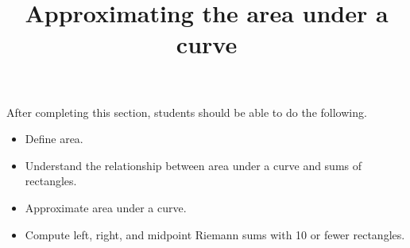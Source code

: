 \documentclass{ximera}
\title{Approximating the area under a curve}
\begin{document}
\begin{abstract}
\end{abstract}

\maketitle

\begin{sectionOutcomes}

After completing this section, students should be able to do the following.

\begin{itemize}
	\item Define area.
	\item Understand the relationship between area under a curve and sums of rectangles.
	\item Approximate area under a curve.
	\item Compute left, right, and midpoint Riemann sums with 10 or fewer rectangles.
\end{itemize}

\end{sectionOutcomes}
\end{document}

